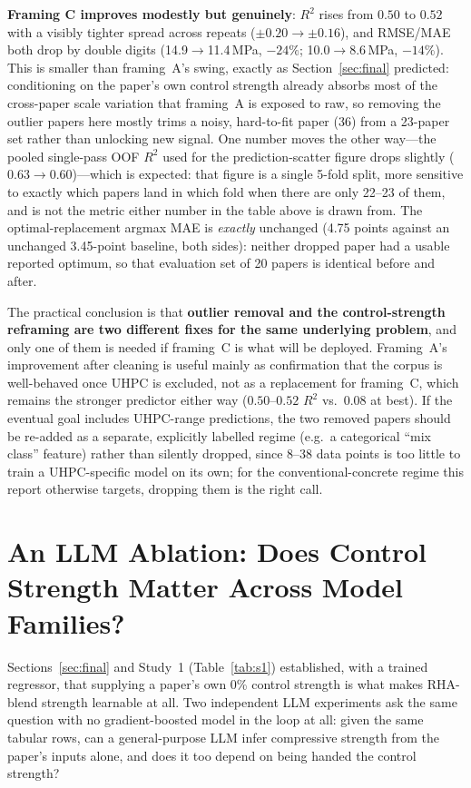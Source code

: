 \documentclass[11pt]{article}
\newcommand{\R}{$R^2$}
\begin{document}
\textbf{Framing C improves modestly but genuinely}: \R{} rises from $0.50$ to $0.52$
with a visibly tighter spread across repeats ($\pm0.20\to\pm0.16$), and RMSE/MAE both
drop by double digits (14.9$\to$11.4\,MPa, $-24\%$; 10.0$\to$8.6\,MPa, $-14\%$). This is
smaller than framing~A's swing, exactly as Section~\ref{sec:final} predicted:
conditioning on the paper's own control strength already absorbs most of the
cross-paper scale variation that framing~A is exposed to raw, so removing the outlier
papers here mostly trims a noisy, hard-to-fit paper (36) from a 23-paper set rather than
unlocking new signal. One number moves the other way---the pooled single-pass OOF
\R{} used for the prediction-scatter figure drops slightly ($0.63\to0.60$)---which is
expected: that figure is a single 5-fold split, more sensitive to exactly which papers
land in which fold when there are only 22--23 of them, and is not the metric either
number in the table above is drawn from. The optimal-replacement argmax MAE is
\emph{exactly} unchanged (4.75 points against an unchanged 3.45-point baseline, both
sides): neither dropped paper had a usable reported optimum, so that evaluation set of
20 papers is identical before and after.

The practical conclusion is that \textbf{outlier removal and the control-strength
reframing are two different fixes for the same underlying problem}, and only one of
them is needed if framing~C is what will be deployed. Framing~A's improvement after
cleaning is useful mainly as confirmation that the corpus is well-behaved once UHPC is
excluded, not as a replacement for framing~C, which remains the stronger predictor
either way ($0.50$--$0.52$ \R{} vs.\ $0.08$ at best). If the eventual goal includes UHPC-range
predictions, the two removed papers should be re-added as a separate, explicitly
labelled regime (e.g.\ a categorical ``mix class'' feature) rather than silently
dropped, since 8--38 data points is too little to train a UHPC-specific model on its
own; for the conventional-concrete regime this report otherwise targets, dropping them
is the right call.

\section{An LLM Ablation: Does Control Strength Matter Across Model Families?}
\label{sec:part2-opus}

Sections~\ref{sec:final} and Study~1 (Table~\ref{tab:s1}) established, with a trained
regressor, that supplying a paper's own 0\% control strength is what makes RHA-blend
strength learnable at all. Two independent LLM experiments ask the same question with
no gradient-boosted model in the loop at all: given the same tabular rows, can a
general-purpose LLM infer compressive strength from the paper's inputs alone, and does
it too depend on being handed the control strength?
\end{document}
